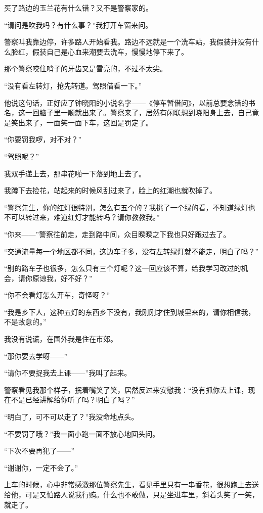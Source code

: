 \par 买了路边的玉兰花有什么错？又不是警察家的。
\par “请问是吹我吗？有什么事？”我打开车窗来问。
\par 警察叫我靠边停，许多路人开始看我。路边不远就是一个洗车站，我假装并没有什么脸红，假装自己是心血来潮要去洗车，慢慢地停下来了。
\par 那个警察咬住哨子的牙齿又是雪亮的，不过不太尖。
\par “没有看左转灯，抢先转道。驾照借看一下。”
\par 他说这句话，正好应了钟晓阳的小说名字——《停车暂借问》，以前总要念错的书名，这一回脑子里一顺就出来了。警察来了，居然有闲联想到晓阳身上去，自己竟是笑出来了，一面笑一面下车，这回是罚定了。
\par “你要罚我啰，对不对？”
\par “驾照呢？”
\par 我双手递上去，那串花啪一下落到地上去了。
\par 我蹲下去捡花，站起来的时候风刮过来了，脸上的红潮也就吹掉了。
\par “警察先生，你的红灯很特别，怎么有五个的？我挑了一个绿的看，不知道绿灯也不可以转过来，难道红灯才能转吗？请你教教我。”
\par “你来——”警察往前走，走到路中间，众目睽睽之下我也只好跟过去了。
\par “交通流量每一个地区都不同，这边车子多，没有左转绿灯就不能走，明白了吗？”
\par “别的路车子也很多，怎么只有三个灯呢？这一回应该不算，给我学习改过的机会，请你原谅我，好不好？”
\par “你不会看灯怎么开车，奇怪呀？”
\par “我是乡下人，这种五灯的东西乡下没有，我刚刚才住到城里来的，请你相信我，不是故意的。”
\par 我没有说谎，在国外我是住在市郊。
\par “那你要去学呀——”
\par “请你不要捉我去上课——”我叫了起来。
\par 警察看见我那个样子，抿着嘴笑了笑，居然反过来安慰我：“没有抓你去上课，现在不是已经讲解给你听了吗？明白了吗？”
\par “明白了，可不可以走了？”我没命地点头。
\par “不要罚了哦？”我一面小跑一面不放心地回头问。
\par “下次不要再犯了——”
\par “谢谢你，一定不会了。”
\par 上车的时候，心中非常感激那位警察先生，看见手里只有一串香花，很想跑上去送给他，可是又怕路人说我行贿。什么也不敢做，只是坐进车里，斜着头笑了一笑，就走了。
